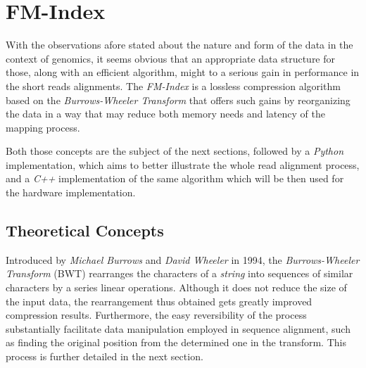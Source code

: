 
\chapter{FM-Index} %

\label{Chapter2} %



With the observations afore stated about the nature and form of the data in the context of genomics, it seems obvious that an appropriate data structure for those, along with an efficient algorithm, might to a serious gain in performance in the short reads alignments. The \textsl{FM-Index} is a lossless compression algorithm based on the \textsl{Burrows-Wheeler Transform} that offers such gains by reorganizing the data in a way that may reduce both memory needs and latency of the mapping process. 

Both those concepts are the subject of the next sections, followed by a \textsl{Python} implementation, which aims to better illustrate the whole read alignment process, and a \textsl{C++} implementation of the same algorithm which will be then used for the hardware implementation.

\section{Theoretical Concepts}

Introduced by \textsl{Michael Burrows} and \textsl{David Wheeler} in 1994, the \textsl{Burrows-Wheeler Transform} (BWT) rearranges the characters of a \textit{string} into sequences of similar characters by a series linear operations. Although it does not reduce the size of the input data, the rearrangement thus obtained gets greatly improved compression results. Furthermore, the easy reversibility of the process substantially facilitate data manipulation employed in sequence alignment, such as finding the original position from the determined one in the transform. This process is further detailed in the next section.

